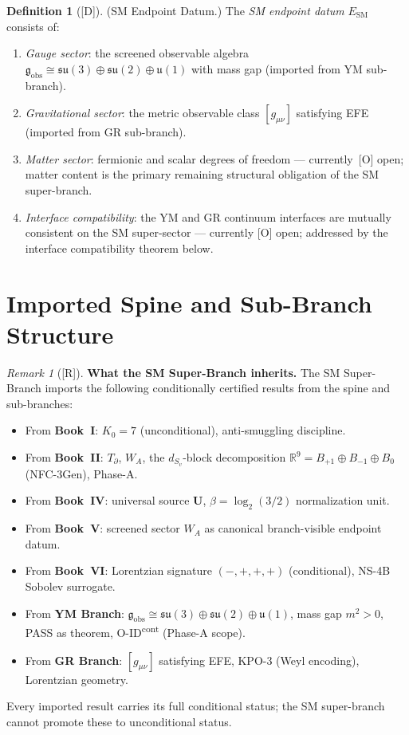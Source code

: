 \documentclass[12pt,oneside]{amsbook}
\theoremstyle{plain}
\theoremstyle{definition}
\newtheorem{definition}[theorem]{Definition}
\theoremstyle{remark}
\newtheorem{remark}[theorem]{Remark}
\newcommand{\status}[1]{\textup{[#1]}}
\begin{document}
\begin{definition}[\status{D}]\label{def:SM-endpoint}
\textup{(SM Endpoint Datum.)}
The \emph{SM endpoint datum} $E_{\mathrm{SM}}$ consists of:
\begin{enumerate}[label=\textup{(\arabic*)}]
 \item \emph{Gauge sector}: the screened observable algebra
 $\mathfrak{g}_{\mathrm{obs}} \cong
 \mathfrak{su}(3)\oplus\mathfrak{su}(2)\oplus\mathfrak{u}(1)$
 with mass gap (imported from YM sub-branch).
 \item \emph{Gravitational sector}: the metric observable class
 $[g_{\mu\nu}]$ satisfying EFE (imported from GR sub-branch).
 \item \emph{Matter sector}: fermionic and scalar degrees of
 freedom --- currently~[O] open; matter content is the
 primary remaining structural obligation of the SM super-branch.
 \item \emph{Interface compatibility}: the YM and GR continuum
 interfaces are mutually consistent on the SM super-sector ---
 currently [O] open; addressed by the interface compatibility
 theorem below.
\end{enumerate}
\end{definition}

\section{Imported Spine and Sub-Branch Structure}
\label{sec:sm-imports}

\begin{remark}[\status{R}]
\textbf{What the SM Super-Branch inherits.}
The SM Super-Branch imports the following conditionally certified
results from the spine and sub-branches:
\begin{itemize}
 \item From \textbf{Book~I}: $K_0 = 7$ (unconditional),
 anti-smuggling discipline.
 \item From \textbf{Book~II}: $T_\partial$, $W_A$, the
 $d_{S_v}$-block decomposition $\mathbb{R}^9 = B_{+1}
 \oplus B_{-1} \oplus B_0$ (NFC-3Gen), Phase-A.
 \item From \textbf{Book~IV}: universal source $\mathbf{U}$,
 $\beta = \log_2(3/2)$ normalization unit.
 \item From \textbf{Book~V}: screened sector $W_A$ as canonical
 branch-visible endpoint datum.
 \item From \textbf{Book~VI}: Lorentzian signature $(-,+,+,+)$
 (conditional), NS-4B Sobolev surrogate.
 \item From \textbf{YM Branch}: $\mathfrak{g}_{\mathrm{obs}}
 \cong \mathfrak{su}(3)\oplus\mathfrak{su}(2)\oplus
 \mathfrak{u}(1)$, mass gap $m^2 > 0$, PASS as theorem,
 O-ID\textsuperscript{cont} (Phase-A scope).
 \item From \textbf{GR Branch}: $[g_{\mu\nu}]$ satisfying EFE,
 KPO-3 (Weyl encoding), Lorentzian geometry.
\end{itemize}
Every imported result carries its full conditional status;
the SM super-branch cannot promote these to unconditional status.
\end{remark}
\end{document}
